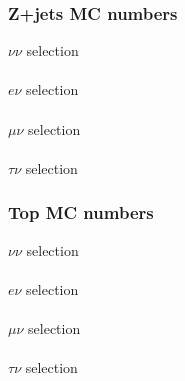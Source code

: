 \documentclass[red,compress,xcolor=table]{beamer}
\begin{document}
\begin{frame}
  \frametitle{Z+jets MC numbers}
\vspace*{-0.5cm}
{\tiny
\centering $\nu\nu$ selection\\
\\
\centering $e\nu$ selection\\
\\
\centering $\mu\nu$ selection\\
\\
\centering $\tau\nu$ selection\\

}
\end{frame}

\begin{frame}
  \frametitle{Top MC numbers}
\vspace*{-0.5cm}
{\tiny
\centering $\nu\nu$ selection\\
\\
\centering $e\nu$ selection\\
\\
\centering $\mu\nu$ selection\\
\\
\centering $\tau\nu$ selection\\

}
\end{frame}
\end{document}
